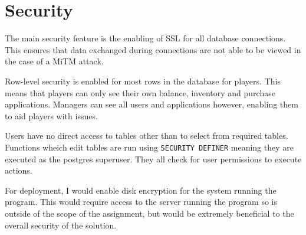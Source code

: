 \section{Security}

The main security feature is the enabling of SSL for all database connections. This ensures that data exchanged during connections are not able to be viewed in the case of a MiTM attack.

Row-level security is enabled for most rows in the database for players. This means that players can only see their own balance, inventory and purchase applications. Managers can see all users and applications however, enabling them to aid players with issues.

Users have no direct access to tables other than to select from required tables. Functions wheich edit tables are run using \verb|SECURITY DEFINER| meaning they are executed as the postgres superuser. They all check for user permissions to execute actions.

For deployment, I would enable disk encryption for the system running the program. This would require access to the server running the program so is outside of the scope of the assignment, but would be extremely beneficial to the overall security of the solution.
